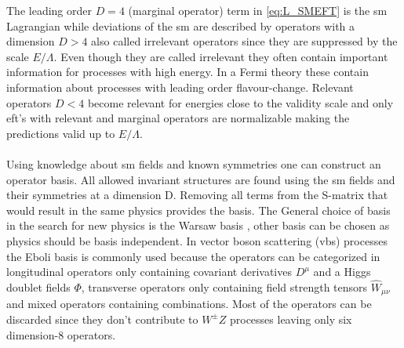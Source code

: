 \documentclass[../Bachelorarbeit.tex]{subfiles}
\begin{document}
The leading order $D = 4$ (marginal operator) term in \ref{eq:L_SMEFT} is the \acrshort{sm} Lagrangian while deviations of the \acrshort{sm} are described by operators with a dimension $D>4$ also called irrelevant operators since they are suppressed by the scale $E/ \Lambda$.
Even though they are called irrelevant they often contain important information for processes with high energy. In a Fermi theory these contain information about processes with leading order flavour-change.
Relevant operators $D<4$ become relevant for energies close to the validity scale and only \acrshort{eft}'s with relevant and marginal operators are normalizable making the predictions valid up to $E/\Lambda$.
\\\\
Using knowledge about \acrshort{sm} fields and known symmetries one can construct an operator basis. All allowed invariant structures are found using the \acrshort{sm} fields and their symmetries at a dimension D.
Removing all terms from the S-matrix that would result in the same physics provides the basis. The General choice of basis in the search for new physics is the Warsaw basis \cite{Brivio.}, other basis can be chosen as physics should be basis independent.
In vector boson scattering (\acrshort{vbs}) processes the Eboli basis\cite{EleniVryonidou.15.02.2019} is commonly used because the operators can be categorized in longitudinal operators only containing covariant derivatives $D^{\mu}$ and a Higgs doublet fields $\Phi$,
transverse operators only containing field strength tensors $\widehat{W}_{\mu\nu}$ and mixed operators containing combinations.
Most of the operators can be discarded since they don't contribute to $W^{\pm}Z$ processes leaving only six dimension-8 operators.
\\
\end{document}
